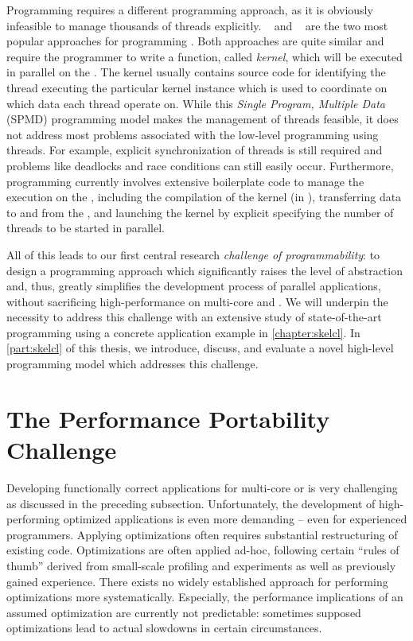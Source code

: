 Programming \GPUs requires a different programming approach, as it is obviously infeasible to manage thousands of threads explicitly.
\CUDA~\cite{CUDAProgrammingGuide} and \OpenCL~\cite{OpenCL} are the two most popular approaches for programming \GPUs.
Both approaches are quite similar and require the programmer to write a function, called \emph{kernel}, which will be executed in parallel on the \GPU.
The kernel usually contains source code for identifying the thread executing the particular kernel instance which is used to coordinate on which data each thread operate on.
While this \emph{Single Program, Multiple Data} (SPMD) programming model makes the management of threads feasible, it does not address most problems associated with the low-level programming using threads.
For example, explicit synchronization of threads is still required and problems like deadlocks and race conditions can still easily occur.
Furthermore, \GPU programming currently involves extensive boilerplate code to manage the execution on the \GPU, including the compilation of the kernel (in \OpenCL), transferring data to and from the \GPU, and launching the kernel by explicit specifying the number of threads to be started in parallel.

All of this leads to our first central research \emph{challenge of programmability}:
to design a programming approach which significantly raises the level of abstraction and, thus, greatly simplifies the development process of parallel applications, without sacrificing high-performance on multi-core \CPUs and \GPUs.
We will underpin the necessity to address this challenge with an extensive study of state-of-the-art \GPU programming using a concrete application example in \autoref{chapter:skelcl}.
In \autoref{part:skelcl} of this thesis, we introduce, discuss, and evaluate a novel high-level programming model which addresses this challenge.

\pagebreak
\section{The Performance Portability Challenge}

Developing functionally correct applications for multi-core \CPUs or \GPUs is very challenging as discussed in the preceding subsection.
Unfortunately, the development of high-performing optimized applications is even more demanding -- even for experienced programmers.
Applying optimizations often requires substantial restructuring of existing code.
Optimizations are often applied ad-hoc, following certain ``rules of thumb'' derived from small-scale profiling and experiments as well as previously gained experience.
There exists no widely established approach for performing optimizations more systematically.
Especially, the performance implications of an assumed optimization are currently not predictable:
sometimes supposed optimizations lead to actual slowdowns in certain circumstances.

